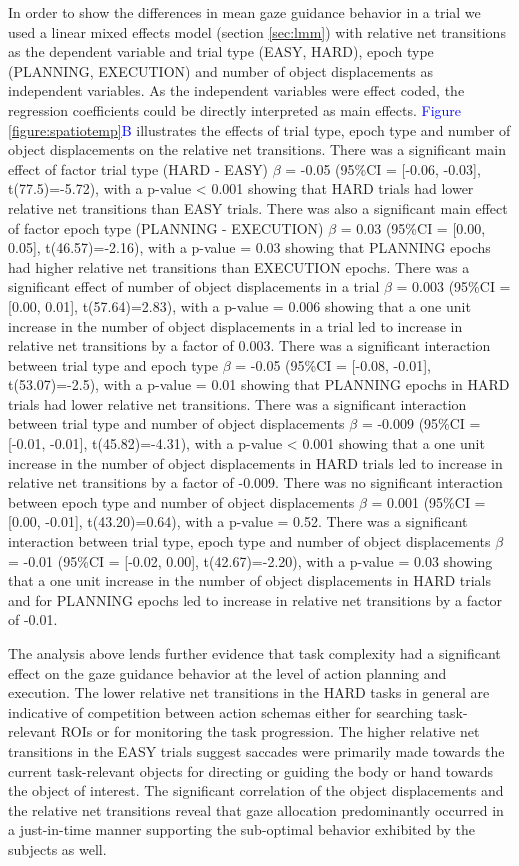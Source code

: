 In order to show the differences in mean gaze guidance behavior in a trial we used a linear mixed effects model (section \ref{sec:lmm}) with relative net transitions as the dependent variable and trial type (EASY, HARD), epoch type (PLANNING, EXECUTION) and number of object displacements as independent variables. As the independent variables were effect coded, the regression coefficients could be directly interpreted as main effects. \textcolor{Blue}{Figure \ref{figure:spatiotemp}B} illustrates the effects of trial type, epoch type and number of object displacements on the relative net transitions. There was a significant main effect of factor trial type (HARD - EASY) $\beta$ = -0.05 (95\%CI = [-0.06, -0.03], t(77.5)=-5.72), with a p-value < 0.001 showing that HARD trials had lower relative net transitions than EASY trials. There was also a significant main effect of factor epoch type (PLANNING - EXECUTION) $\beta$ = 0.03 (95\%CI = [0.00, 0.05], t(46.57)=-2.16), with a p-value = 0.03 showing that PLANNING epochs had higher relative net transitions than EXECUTION epochs. There was a significant effect of number of object displacements in a trial $\beta$ = 0.003 (95\%CI = [0.00, 0.01], t(57.64)=2.83), with a p-value = 0.006 showing that a one unit increase in the number of object displacements in a trial led to increase in relative net transitions by a factor of 0.003. There was a significant interaction between trial type and epoch type $\beta$ = -0.05 (95\%CI = [-0.08, -0.01], t(53.07)=-2.5), with a p-value = 0.01 showing that PLANNING epochs in HARD trials had lower relative net transitions. There was a significant interaction between trial type and number of object displacements $\beta$ = -0.009 (95\%CI = [-0.01, -0.01], t(45.82)=-4.31), with a p-value < 0.001 showing that a one unit increase in the number of object displacements in HARD trials led to increase in relative net transitions by a factor of -0.009. There was no significant interaction between epoch type and number of object displacements $\beta$ = 0.001 (95\%CI = [0.00, -0.01], t(43.20)=0.64), with a p-value = 0.52. There was a significant interaction between trial type, epoch type and number of object displacements $\beta$ = -0.01 (95\%CI = [-0.02, 0.00], t(42.67)=-2.20), with a p-value = 0.03 showing that a one unit increase in the number of object displacements in HARD trials and for PLANNING epochs led to increase in relative net transitions by a factor of -0.01.

The analysis above lends further evidence that task complexity had a significant effect on the gaze guidance behavior at the level of action planning and execution. The lower relative net transitions in the HARD tasks in general are indicative of competition between action schemas either for searching task-relevant ROIs or for monitoring the task progression. The higher relative net transitions in the EASY trials suggest saccades were primarily made towards the current task-relevant objects for directing or guiding the body or hand towards the object of interest. The significant correlation of the object displacements and the relative net transitions reveal that gaze allocation predominantly occurred in a just-in-time manner supporting the sub-optimal behavior exhibited by the subjects as well. 

